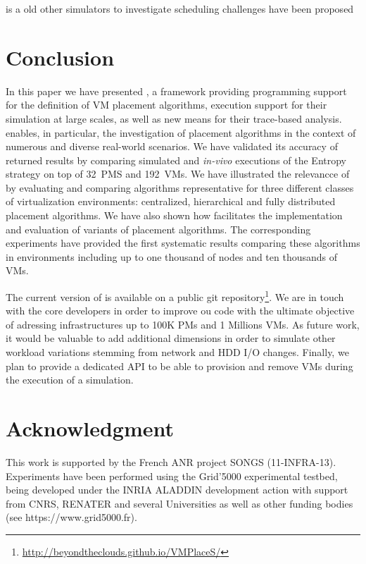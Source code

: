  is a old other simulators to investigate
scheduling challenges have been proposed

\section{Conclusion}
\label{sec:conclusion}
In this paper we have presented
\vmps, a framework providing programming support for the definition of
VM placement algorithms, execution support for their simulation at
large scales, as well as new means for their trace-based analysis.
\vmps enables, in particular, the investigation of placement
algorithms in the context of numerous and diverse real-world
scenarios. We have validated its accuracy of returned results by
comparing simulated and \textit{in-vivo} executions of the Entropy
strategy on top of 32~PMS and 192~VMs. We have illustrated the
relevancce of \vmps by evaluating and comparing algorithms
representative for three different classes of virtualization
environments: centralized, hierarchical and fully distributed
placement algorithms. We have also shown how \vmps facilitates the
implementation and evaluation of variants of placement algorithms. The
corresponding experiments have provided the first systematic results
comparing these algorithms in environments including up to one
thousand of nodes and ten thousands of VMs.

The current version of \vmps is available on a public git
repository\footnote{\url{http://beyondtheclouds.github.io/VMPlaceS/}}.
We are in touch with the \sg core developers in order to improve ou
code with the ultimate objective of adressing infrastructures up to
100K PMs and 1 Millions VMs. As future work, it would be valuable to add
additional dimensions in order to simulate other workload variations
stemming from network and HDD I/O changes. Finally,
we plan to provide a dedicated API to be able to
provision and remove VMs during the execution of a simulation.

\section{Acknowledgment}

This work is supported by the French ANR project SONGS (11-INFRA-13).
Experiments have been performed using the Grid'5000 experimental
testbed, being developed under the INRIA ALADDIN development action
with support from CNRS, RENATER and several Universities as well as
other funding bodies (see https://www.grid5000.fr).


